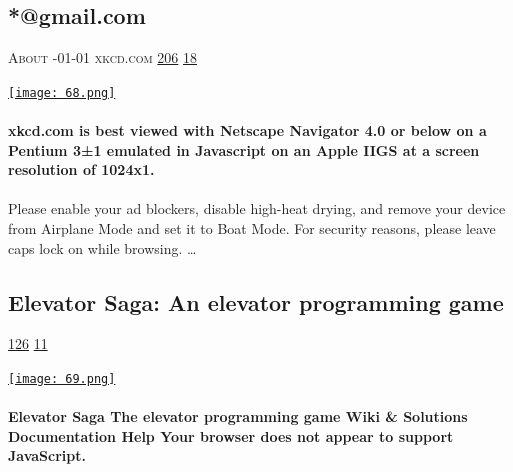 \documentclass[10pt,a4paper]{article}
\begin{document}
\begin{multicols}{2}
\begin{minipage}{\linewidth}
\subsection{*@gmail.com}
\textsc{\footnotesize
{\scriptsize\faUser}\space 
About 
{\scriptsize\faCalendar}-01-01 
{\scriptsize\faGlobe}\space 
xkcd.com 
{\scriptsize\faThumbsOUp}\space 
\href{http://news.ycombinator.com/item?id=37333848\&utm\_term=comment}{206} 
{\scriptsize\faComments}\space 
\href{http://news.ycombinator.com/item?id=37333848\&utm\_term=comment}{18} 
}
\par\medskip\noindent
\href{https://xkcd.com/2822/?utm\_source=hackernewsletter\&utm\_medium=email\&utm\_term=fun}{
    \texttt{[image: 68.png]}
}
\end{minipage}
\paragraph{}
\textbf{xkcd.com is best viewed with Netscape Navigator 4.0 or below on a Pentium 3±1 emulated in Javascript on an Apple IIGS at a screen resolution of 1024x1.}
\paragraph{}
 Please enable your ad blockers, disable high-heat drying, and remove your device from Airplane Mode and set it to Boat Mode. For security reasons, please leave caps lock on while browsing.
\dots\par
\noindent\begin{minipage}{\linewidth}
\medskip
\subsection{Elevator Saga: An elevator programming game}
\textsc{\footnotesize
{\scriptsize\faThumbsOUp}\space 
\href{http://news.ycombinator.com/item?id=37306262\&utm\_term=comment}{126} 
{\scriptsize\faComments}\space 
\href{http://news.ycombinator.com/item?id=37306262\&utm\_term=comment}{11} 
}
\par\medskip\noindent
\href{https://play.elevatorsaga.com/index.html?utm\_source=hackernewsletter\&utm\_medium=email\&utm\_term=fun}{
    \texttt{[image: 69.png]}
}
\end{minipage}
\paragraph{}
\textbf{Elevator Saga
The elevator programming game
Wiki \& Solutions
Documentation
Help
Your browser does not appear to support JavaScript.}

\end{multicols}
\end{document}
